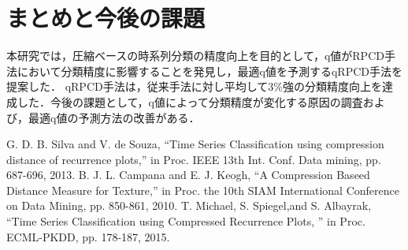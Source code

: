 \documentclass{interim} %
\begin{document}
\section{まとめと今後の課題}
本研究では，圧縮ベースの時系列分類の精度向上を目的として，q値がRPCD手法において分類精度に影響することを発見し，最適q値を予測するqRPCD手法を提案した．
qRPCD手法は，従来手法に対し平均して3\%強の分類精度向上を達成した．今後の課題として，q値によって分類精度が変化する原因の調査および，最適q値の予測方法の改善がある．
\begin{thebibliography}{99}
	\scriptsize  %
%	
	G. D. B. Silva and V. de Souza, ``Time Series Classification using compression distance of recurrence plots,'' in Proc. IEEE 13th Int. Conf. Data mining, pp. 687-696, 2013.
		B. J. L. Campana and E. J. Keogh, ``A Compression Baseed Distance Measure for Texture,'' in Proc.  the 10th SIAM International Conference on Data Mining, pp. 850-861, 2010.
	T. Michael, S. Spiegel,and S. Albayrak, ``Time Series Classification using Compressed Recurrence Plots, '' in Proc. ECML-PKDD, pp. 178-187, 2015.
\end{thebibliography}
\end{document}
